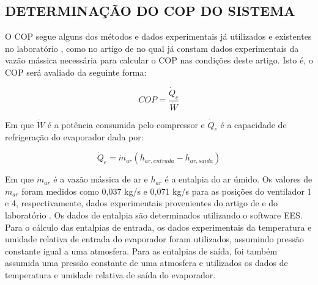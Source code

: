 \newpage
\subsection{\MakeUppercase{Determinação do COP do Sistema}} \label{subsec:Determinação do COP do Sistema}

O COP segue alguns dos métodos e dados experimentais já utilizados e existentes no laboratório \textcite{reve2023}, como no artigo de \textcite{ExperimentalThermalPerformance} no qual já constam dados experimentais da vazão mássica necessária para calcular o COP nas condições deste artigo. Isto é, o COP será avaliado da seguinte forma:

\begin{equation}
    COP = \frac{\dot Q_e}{\dot W}
    \label{eq:COP}
\end{equation}

Em que $\dot W$ é a potência consumida pelo compressor e $ \dot Q_e$ é a capacidade de refrigeração do evaporador dada por:

\begin{equation}
    \dot Q_e = \dot m_{ar}(h_{ar,entrada} - h_{ar,saida})
\end{equation}

Em que $\dot m_{ar}$ é a vazão mássica de ar e $h_{ar}$ é a entalpia do ar úmido. Os valores de $\dot m_{ar}$ foram medidos como 0,037 kg/s e 0,071 kg/s para as posições do ventilador 1 e 4, respectivamente, dados experimentais provenientes do artigo de \textcite{ExperimentalThermalPerformance} e do laboratório \textcite{reve2023}. Os dados de entalpia são determinados utilizando o software EES. Para o cálculo das entalpias de entrada, os dados experimentais da temperatura e umidade relativa de entrada do evaporador foram utilizados, assumindo pressão constante igual a uma atmosfera. Para as entalpias de saída, foi também assumida uma pressão constante de uma atmosfera e utilizados os dados de temperatura e umidade relativa de saída do evaporador. 